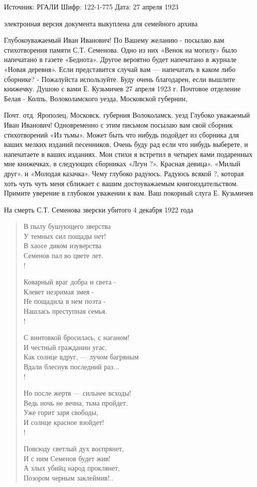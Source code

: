 \documentclass[]{memoir}
\begin{document}
Источник: РГАЛИ
Шифр: 122-1-775
Дата: 27 апреля 1923

электронная версия документа выкуплена для семейного архива

Глубокоуважаемый Иван Иванович!
По Вашему желанию - посылаю вам стихотворения памяти С.Т. Семенова. Одно из них «Венок на могилу» было напечатано в газете «Беднота». Другое вероятно будет напечатано в журнале «Новая деревня». Если представится случай вам — напечатать в каком либо сборнике? - Пожалуйста используйте. Буду очень благодарен, если вышлите книжечку.
Душою с вами Е. Кузьмичев
27 апреля 1923 г.
Почтовое отделение Белая - Колпь, Волоколамского уезда, Московской губернии,


Почт. отд. Ярополец, Московск. губерния Волоколамск. уезд
Глубоко уважаемый Иван Иванович!
Одновременно с этим письмом посылаю вам свой сборник стихотворений «Из тьмы». Может быть что нибудь подойдет из сборника для ваших мелких изданий песенников, Очень буду рад если что нибудь выберете, и напечатаете в ваших изданиях.
Мои стихи я встретил в четырех вами подаренных мне книжечках, в следующих сборниках «Лгун ?». Красная девица». «Милый друг». и «Молодая казачка». Чему глубоко радуюсь.  Радуюсь всякой  ?, которая хоть чуть чуть меня сближает с вашим достоуважаемым книгоиздательством.
Примите уверение в глубоком уважении к вам.
Ваш покорный слуга Е. Кузьмичев



На смерть С.Т. Семенова
зверски убитого 4 декабря 1922 года

\begin{verse}
В пылу бушующего зверства\\
  У темных сил пощады нет!\\
В хаосе диком изуверства\\
  Семенов пал во цвете лет.\\!

Коварный враг добра и света -\\
  Клевет незримая змея -\\
Не пощадила в нем поэта -\\
  Нашлась преступная семья.\\!

С винтовкой бросилась, с наганом!\\
  И честный гражданин угас,\\
Как солнце вдруг, — лучом багряным\\
  Вдали блеснув последний раз...\\!

Но после жертв — сильнее всходы!\\
  Ведь ночь не вечна, тьма пройдет.\\
Уже горит заря свободы,\\
  И солнце красное взойдет!\\!

Повсюду светлый дух воспрянет,\\
  И с ним Семенов будет жив!\\
А злых убийц народ проклянет,\\
  Позором черным заклеймив!..
\end{verse}
  
\end{document}
